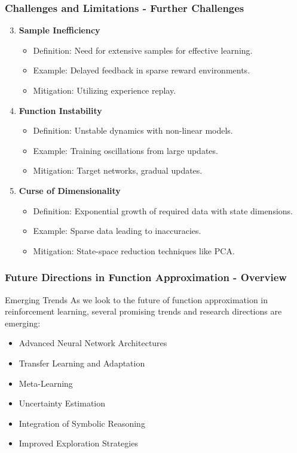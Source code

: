 \documentclass[aspectratio=169]{beamer}
\begin{document}
\begin{frame}[fragile]
  \frametitle{Challenges and Limitations - Further Challenges}

  \begin{enumerate}
    \setcounter{enumi}{2}
    \item \textbf{Sample Inefficiency}
      \begin{itemize}
        \item Definition: Need for extensive samples for effective learning.
        \item Example: Delayed feedback in sparse reward environments.
        \item Mitigation: Utilizing experience replay.
      \end{itemize}

    \item \textbf{Function Instability}
      \begin{itemize}
        \item Definition: Unstable dynamics with non-linear models.
        \item Example: Training oscillations from large updates.
        \item Mitigation: Target networks, gradual updates.
      \end{itemize}

    \item \textbf{Curse of Dimensionality}
      \begin{itemize}
        \item Definition: Exponential growth of required data with state dimensions.
        \item Example: Sparse data leading to inaccuracies.
        \item Mitigation: State-space reduction techniques like PCA.
      \end{itemize}
  \end{enumerate}
\end{frame}

\begin{frame}[fragile]
  \frametitle{Future Directions in Function Approximation - Overview}
  \begin{block}{Emerging Trends}
    As we look to the future of function approximation in reinforcement learning, several promising trends and research directions are emerging:
    \begin{itemize}
      \item Advanced Neural Network Architectures
      \item Transfer Learning and Adaptation
      \item Meta-Learning
      \item Uncertainty Estimation
      \item Integration of Symbolic Reasoning
      \item Improved Exploration Strategies
    \end{itemize}
  \end{block}
\end{frame}
\end{document}

